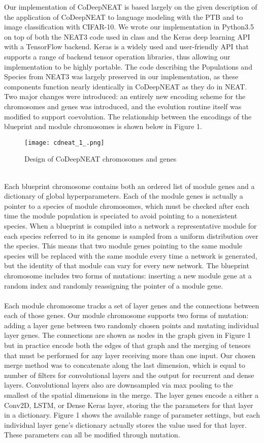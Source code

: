 \documentclass[11pt]{article}
\begin{document}
Our implementation of CoDeepNEAT is based largely on the given description of the application of CoDeepNEAT to language modeling with the PTB and to image classification with CIFAR-10. We wrote our implementation in Python3.5 on top of both the NEAT3 code used in class and the Keras deep learning API with a TensorFlow backend. Keras is a widely used and user-friendly API that supports a range of backend tensor operation libraries, thus allowing our implementation to be highly portable. The code describing the Populations and Species from NEAT3 was largely preserved in our implementation, as these components function nearly identically in CoDeepNEAT as they do in NEAT. Two major changes were introduced: an entirely new encoding scheme for the chromosomes and genes was introduced, and the evolution routine itself was modified to support coevolution. The relationship between the encodings of the blueprint and module chromosomes is shown below in Figure 1.\\
\begin{figure}[h]
\centering
\texttt{[image: cdneat\_1\_.png]}
\caption{Design of CoDeepNEAT chromosomes and genes}
\end{figure}
	\\Each blueprint chromosome contains both an ordered list of module genes and a dictionary of global hyperparameters. Each of the module genes is actually a pointer to a species of module chromosomes, which must be checked after each time the module population is speciated to avoid pointing to a nonexistent species. When a blueprint is compiled into a network a representative module for each species referred to in its genome is sampled from a uniform distribution over the species. This means that two module genes pointing to the same module species will be replaced with the same module every time a network is generated, but the identity of that module can vary for every new network. The blueprint chromosome includes two forms of mutations: inserting a new module gene at a random index and randomly reassigning the pointer of a module gene.\\ 
	\\Each module chromosome tracks a set of layer genes and the connections between each of those genes. Our module chromosome supports two forms of mutation: adding a layer gene between two randomly chosen points and mutating individual layer genes. The connections are shown as nodes in the graph given in Figure 1 but in practice encode both the edges of that graph and the merging of tensors that must be performed for any layer receiving more than one input. Our chosen merge method was to concatenate along the last dimension, which is equal to number of filters for convolutional layers and the output for recurrent and dense layers. Convolutional layers also are downsampled via max pooling to the smallest of the spatial dimensions in the merge. The layer genes encode a either a Conv2D, LSTM, or Dense Keras layer, storing the the parameters for that layer in a dictionary. Figure 1 shows the available range of parameter settings, but each individual layer gene's dictionary actually stores the value used for that layer. These parameters can all be modified through mutation.\\
\end{document}
